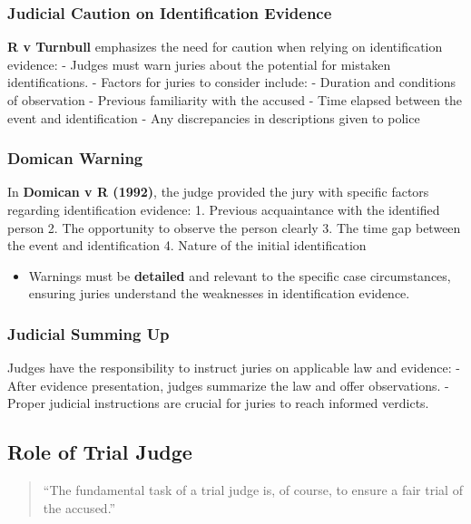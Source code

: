 \subsubsection{Judicial Caution on Identification
Evidence}\label{judicial-caution-on-identification-evidence}

\textbf{R v Turnbull} emphasizes the need for caution when relying on
identification evidence: - Judges must warn juries about the potential
for mistaken identifications. - Factors for juries to consider include:
- Duration and conditions of observation - Previous familiarity with the
accused - Time elapsed between the event and identification - Any
discrepancies in descriptions given to police

\subsubsection{Domican Warning}\label{domican-warning}

In \textbf{Domican v R (1992)}, the judge provided the jury with
specific factors regarding identification evidence: 1. Previous
acquaintance with the identified person 2. The opportunity to observe
the person clearly 3. The time gap between the event and identification
4. Nature of the initial identification

\begin{itemize}
\tightlist
\item
  Warnings must be \textbf{detailed} and relevant to the specific case
  circumstances, ensuring juries understand the weaknesses in
  identification evidence.
\end{itemize}

\subsubsection{Judicial Summing Up}\label{judicial-summing-up}

Judges have the responsibility to instruct juries on applicable law and
evidence: - After evidence presentation, judges summarize the law and
offer observations. - Proper judicial instructions are crucial for
juries to reach informed verdicts.

\subsection{  Role of Trial Judge}\label{role-of-trial-judge}

\begin{quote}
``The fundamental task of a trial judge is, of course, to ensure a fair
trial of the accused.''
\end{quote}

